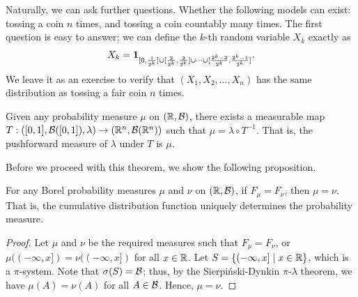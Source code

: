 Naturally, we can ask further questions. Whether the following models can exist: tossing a coin $n$ times, and tossing a coin countably many times. The first question is easy to answer; we can define the $k$-th random variable $X_{k}$ exactly as
\begin{align}
    X_{k} = \textbf{1}_{[0,\frac{1}{2^{k}}] \cup [\frac{2}{2^{k}},\frac{3}{2^{k}}] \cup \cdots \cup [\frac{2^{k}-2}{2^{k}},\frac{2^{k}-1}{2^{k}}]}.
\end{align}
We leave it as an exercise to verify that $(X_{1},X_{2},\ldots,X_{n})$ has the same distribution as tossing a fair coin $n$ times.

\begin{theorem}
    Given any probability measure $\mu$ on $(\mathbb{R},\mathcal{B})$, there exists a measurable map $T:([0,1],\mathcal{B}([0,1]),\lambda) \to (\mathbb{R}^{n},\mathcal{B}(\mathbb{R}^{n}))$ such that $\mu = \lambda \circ T^{-1}$. That is, the pushforward measure of $\lambda$ under $T$ is $\mu$. 
\end{theorem}

Before we proceed with this theorem, we show the following proposition.
\begin{proposition}
    For any Borel probability measures $\mu$ and $\nu$ on $(\mathbb{R},\mathcal{B})$, if $F_{\mu} = F_{\nu}$, then $\mu = \nu$. That is, the cumulative distribution function uniquely determines the probability measure.
\end{proposition}
\begin{proof}
    Let $\mu$ and $\nu$ be the required measures such that $F_{\mu} = F_{\nu}$, or $\mu((-\infty,x]) = \nu((-\infty,x])$ for all $x \in \mathbb{R}$. Let $S = \{(-\infty,x] \mid x \in \mathbb{R}\}$, which is a $\pi$-system. Note that $\sigma(S) = \mathcal{B}$; thus, by the Sierpiński-Dynkin $\pi$-$\lambda$ theorem, we have $\mu(A) = \nu(A)$ for all $A \in \mathcal{B}$. Hence, $\mu = \nu$.
\end{proof}

